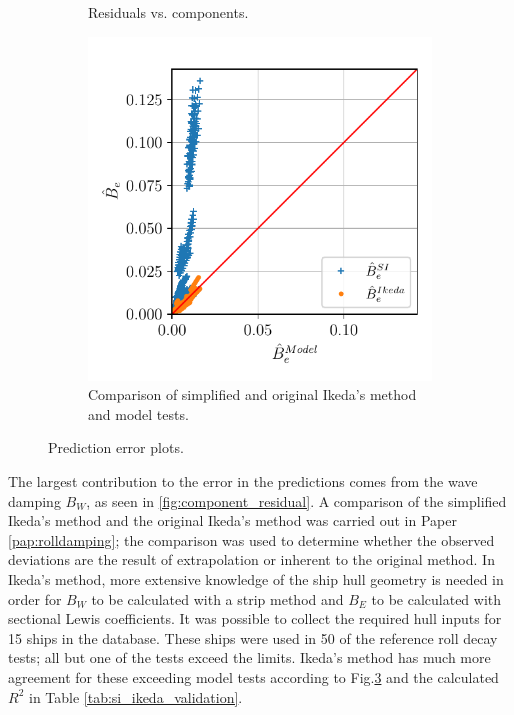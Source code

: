 \begin{figure}[h!]
\begin{subfigure}[b]{0.45\textwidth}
        \vspace{-0.2cm}
        \caption{Residuals vs. components.}
        \label{fig:component_residual}
        \vspace{0.3cm}
    \end{subfigure}
    \hfill
    \begin{subfigure}[b]{0.45\textwidth}
        \centering
        \includegraphics[width=\textwidth]{kappa/images/si_ikeda_model.pdf}
        \caption{Comparison of simplified and original Ikeda's method and model tests.}
        \label{fig:si_ikeda_model}
    \end{subfigure}

    \caption{Prediction error plots.}
\end{figure}

\noindent The largest contribution to the error in the predictions comes from the wave damping $B_W$, as seen in \autoref{fig:component_residual}. A comparison of the simplified Ikeda's method and the original Ikeda's method was carried out in Paper \ref{pap:rolldamping}; the comparison was used to determine whether the observed deviations are the result of extrapolation or inherent to the original method. In Ikeda's method, more extensive knowledge of the ship hull geometry is needed in order for $B_W$ to be calculated with a strip method and $B_E$ to be calculated with sectional Lewis coefficients. It was possible to collect the required hull inputs for 15 ships in the database. These ships were used in 50 of the reference roll decay tests; all but one of the tests exceed the limits. Ikeda's method has much more agreement for these exceeding model tests according to Fig.\ref{fig:si_ikeda_model} and the calculated $R^2$ in Table \ref{tab:si_ikeda_validation}.

